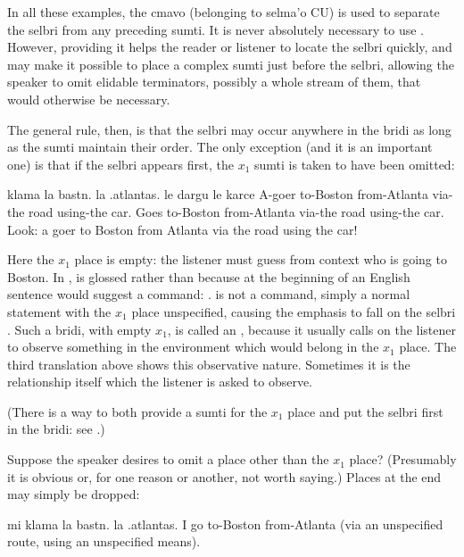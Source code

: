 In all these examples, the cmavo  (belonging to
    selma'o CU) is used to separate the selbri from any preceding
    sumti. It is never absolutely necessary to use . However,
    providing it helps the reader or listener to locate the selbri
    quickly, and may make it possible to place a complex sumti just
    before the selbri, allowing the speaker to omit elidable
    terminators, possibly a whole stream of them, that would
    otherwise be necessary.

The general rule, then, is that the selbri may occur
    anywhere in the bridi as long as the sumti maintain their
    order. The only exception (and it is an important one) is that
    if the selbri appears first, the $x_1$ sumti is taken to have been
    omitted:
\begin{example}
klama la bastn. la .atlantas. le dargu le karce\n
A-goer to-Boston from-Atlanta via-the road using-the car.\n
Goes to-Boston from-Atlanta via-the road using-the car.\n
Look: a goer to Boston from Atlanta via the road\n
\T	using the car!
\end{example}

Here the $x_1$ place is empty: the listener must guess from
    context who is going to Boston. In ,  is glossed  rather than 
    because  at the beginning of an English sentence would
    suggest a command: .  is not a command, simply a normal statement with the $x_1$
    place unspecified, causing the emphasis to fall on the selbri
    . Such a bridi, with empty $x_1$, is called an
    , because it usually calls on the listener to
    observe something in the environment which would belong in the
    $x_1$ place. The third translation above shows this observative
    nature. Sometimes it is the relationship itself which the
    listener is asked to observe. 

(There is a way to both provide a sumti for the $x_1$ place and
    put the selbri first in the bridi: see .)

Suppose the speaker desires to omit a place other than the
    $x_1$ place? (Presumably it is obvious or, for one reason or
    another, not worth saying.) Places at the end may simply be
    dropped:
\begin{example}
mi klama la bastn. la .atlantas.\n
I go to-Boston from-Atlanta (via an unspecified route,\n
using an unspecified means).
\end{example}

